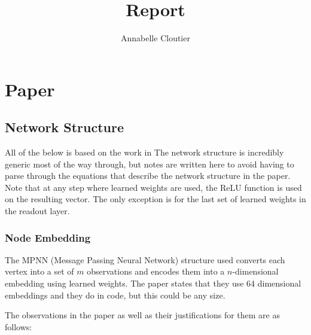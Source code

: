 \documentclass{article}
\title{Report}
\author{Annabelle Cloutier}
\begin{document}
\maketitle

\section{Paper}

\subsection{Network Structure}

All of the below is based on the work in \cite{eco-dqn}
The network structure is incredibly generic most of the way through, but notes are written here to avoid having to parse through the equations that describe the network structure in the paper. Note that at any step where learned weights are used, the ReLU function is used on the resulting vector. The only exception is for the last set of learned weights in the readout layer.

\subsubsection{Node Embedding}

The MPNN (Message Passing Neural Network) structure used converts each vertex into a set of $m$ observations and encodes them into a $n$-dimensional embedding using learned weights. The paper states that they use 64 dimensional embeddings and they do in code, but this could be any size. 

The observations in the paper as well as their justifications for them are as follows: 
\end{document}
